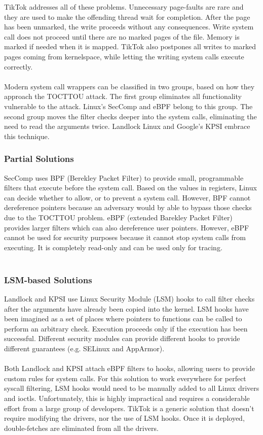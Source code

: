 \documentclass[conference]{IEEEtran}
\begin{document}
TikTok addresses all of these problems. Unnecessary page-faults are rare and they are used to make the offending thread wait for completion. After the page has been unmarked,
the write proceeds without any consequences. Write system call does not proceed until there are no marked pages of the file. Memory is marked if needed when it is mapped. 
TikTok also postpones all writes to marked pages coming from kernelspace, while letting the writing system calls execute correctly.
\\
\\
Modern system call wrappers can be classified in two groups, based on how they approach the TOCTTOU attack. The first group eliminates all functionality vulnerable to the attack.
Linux's SecComp and eBPF belong to this group. The second group moves the filter checks deeper into the system calls, eliminating the need to read the arguments twice. Landlock
Linux and Google's KPSI embrace this technique.

\subsubsection{Partial Solutions}
SecComp uses BPF (Berekley Packet Filter) to provide small, programmable filters that execute before the system call. Based on the values in registers, Linux can decide whether
to allow, or to prevent a system call. However, BPF cannot dereference pointers because an adversary would by able to bypass those checks due to the TOCTTOU problem. eBPF 
(extended Barekley Packet Filter) provides larger filters which can also dereference user pointers. However, eBPF cannot be used for security purposes because it cannot stop
system calls from executing. It is completely read-only and can be used only for tracing.
\\
\\
\subsubsection{LSM-based Solutions}
Landlock and KPSI use Linux Security Module\cite{lsm} (LSM) hooks to call filter checks after the arguments have already been copied into the kernel. LSM hooks have been imagined
as a set of places where pointers to functions can be called to perform an arbitrary check. Execution proceeds only if the execution has been successful. Different security modules
can provide different hooks to provide different guarantees (e.g. SELinux and AppArmor).
\\
\\
Both Landlock and KPSI attach eBPF filters to hooks, allowing users to provide custom rules for system calls. For this solution to work everywhere for perfect syscall filtering, 
LSM hooks would need to be manually added to all Linux drivers and ioctls. Unfortunately, this is highly impractical and requires a considerable effort from a large group of developers.
TikTok is a generic solution that doesn't require modifying the drivers, nor the use of LSM hooks. Once it is deployed, double-fetches are eliminated from all the drivers.
\end{document}
